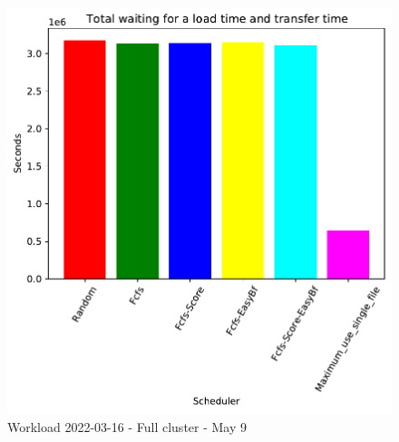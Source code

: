 \documentclass[a4paper]{article}
\begin{document}
\begin{figure}[H]
	\begin{minipage}[b]{0.5\linewidth}\centering\includegraphics[width=1\linewidth]{MBSS/plot/2022-03-16_Total_waiting_for_a_load_time_and_transfer_time450_128_32_256_4_1024.pdf}\caption{Waiting for a load + Transfer time}\vspace{4ex}\end{minipage}\caption{Workload 2022-03-16 - Full cluster - May 9}\end{figure}
	
\end{document}
